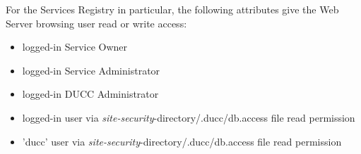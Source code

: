 	For the Services Registry in particular, the following attributes give 
	the Web Server browsing user read or write access:
	
	\begin{itemize}
       \item logged-in Service Owner             
       \item logged-in Service Administrator
       \item logged-in DUCC Administrator        
       \item logged-in user via {\em site-security}-directory/.ducc/db.access file read permission
       \item 'ducc' user via {\em site-security}-directory/.ducc/db.access file read permission
    \end{itemize}

      \ifpdf
      \else
      \fi
      

      \ifpdf
      \else
      \fi
      

      \ifpdf
      \else
      \fi
      

      \ifpdf
      \else
      \fi
      

      \ifpdf
      \else
      \fi
      

      \ifpdf
      \else
      \fi
      

      \ifpdf
      \else
      \fi
      

      \ifpdf
      \else
      \fi
      
      
      \ifpdf
      \else
      \fi
      
